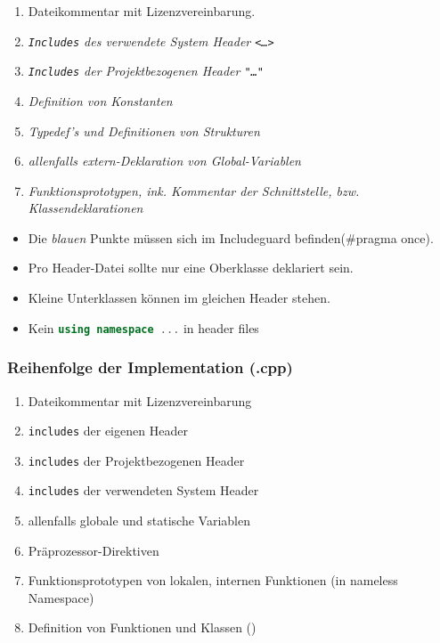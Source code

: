 \begin{enumerate}[itemsep=1pt, parsep=0pt]
    \item Dateikommentar mit Lizenzvereinbarung.
    \item \textit{\color{blue} \texttt{Includes} des verwendete System Header \texttt{<\dots>}}
    \item \textit{\color{blue} \texttt{Includes} der Projektbezogenen Header \texttt{"\dots"}}
    \item \textit{\color{blue} Definition von Konstanten}
    \item \textit{\color{blue} Typedef's und Definitionen von Strukturen}
    \item \textit{\color{blue} allenfalls extern-Deklaration von Global-Variablen}
    \item \textit{\color{blue} Funktionsprototypen, ink. Kommentar der Schnittstelle, bzw. Klassendeklarationen}
\end{enumerate}

\begin{itemize}
    \item Die \textit{blauen} Punkte müssen sich im Includeguard befinden(\#pragma once).
    \item Pro Header-Datei sollte nur eine Oberklasse deklariert sein. 
    \item Kleine Unterklassen können im gleichen Header stehen.
    \item Kein \lstinline[language=C++]|using namespace ...| in header files
\end{itemize}

\subsubsection{Reihenfolge der Implementation (.cpp)}

\begin{enumerate}[itemsep=1pt, parsep=0pt]
    \item Dateikommentar mit Lizenzvereinbarung
    \item \texttt{includes} der eigenen Header
    \item \texttt{includes} der Projektbezogenen Header
    \item \texttt{includes} der verwendeten System Header
    \item allenfalls globale und statische Variablen
    \item Präprozessor-Direktiven
    \item Funktionsprototypen von lokalen, internen Funktionen (in nameless Namespace)
    \item Definition von Funktionen und Klassen ()
\end{enumerate}

